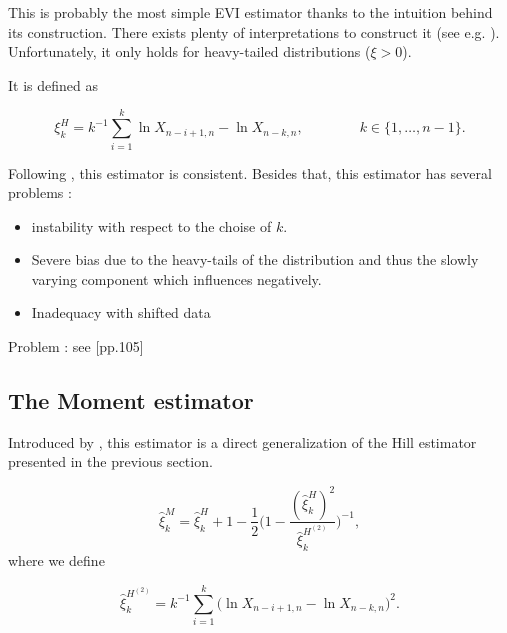 \documentclass[11pt,a4paper,openany ]{book}
\begin{document}
This is probably the most simple EVI estimator thanks to the intuition behind its construction. There exists plenty of interpretations to construct it (see e.g. \citet[pp.101-104]{beirlant_statistics_2006}). Unfortunately, it only holds for heavy-tailed distributions ($\xi>0$). 




It is defined as 

\begin{equation}
\xi^H_{k}=k^{-1}\sum_{i=1}^k\ln X_{n-i+1,n}-\ln X_{n-k,n}, \qquad\qquad k\in\{1,\dots,n-1\}.
\end{equation}



Following \cite{mason_}, this estimator is consistent. Besides that, this estimator has several problems : 

\begin{itemize}
	\item instability with respect to the choise of $k$.
	\item Severe bias due to the heavy-tails of the distribution and thus the slowly varying component which influences negatively.
	\item Inadequacy with shifted data
\end{itemize}


Problem : see [pp.105]


\subsection*{The Moment estimator}

Introduced by \cite{dekkers_moment_1989}, this estimator is a direct generalization of the Hill estimator presented in the previous section. 

\begin{equation}
\hat{\xi}^M_k=\hat{\xi}_k^H+1-\frac{1}{2}\Bigg(1-\frac{(\hat{\xi}_k^H)^2}{\hat{\xi}^{H^{(2)}}_k }\Bigg)^{-1},
\end{equation}
where we define 

\begin{equation*}
\hat{\xi}^{H^{(2)}}_k=k^{-1}\sum_{i=1}^k\big(\ln X_{n-i+1,n}-\ln X_{n-k,n}\big)^2.
\end{equation*}
\end{document}
